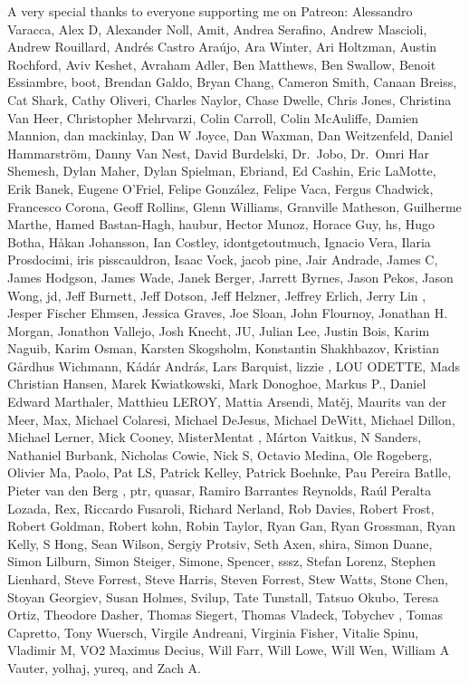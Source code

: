 \documentclass[
  letterpaper,
  DIV=11,
  numbers=noendperiod]{scrartcl}
\begin{document}
A very special thanks to everyone supporting me on Patreon: Alessandro
Varacca, Alex D, Alexander Noll, Amit, Andrea Serafino, Andrew Mascioli,
Andrew Rouillard, Andrés Castro Araújo, Ara Winter, Ari Holtzman, Austin
Rochford, Aviv Keshet, Avraham Adler, Ben Matthews, Ben Swallow, Benoit
Essiambre, boot, Brendan Galdo, Bryan Chang, Cameron Smith, Canaan
Breiss, Cat Shark, Cathy Oliveri, Charles Naylor, Chase Dwelle, Chris
Jones, Christina Van Heer, Christopher Mehrvarzi, Colin Carroll, Colin
McAuliffe, Damien Mannion, dan mackinlay, Dan W Joyce, Dan Waxman, Dan
Weitzenfeld, Daniel Hammarström, Danny Van Nest, David Burdelski,
Dr.~Jobo, Dr.~Omri Har Shemesh, Dylan Maher, Dylan Spielman, Ebriand, Ed
Cashin, Eric LaMotte, Erik Banek, Eugene O'Friel, Felipe González,
Felipe Vaca, Fergus Chadwick, Francesco Corona, Geoff Rollins, Glenn
Williams, Granville Matheson, Guilherme Marthe, Hamed Bastan-Hagh,
haubur, Hector Munoz, Horace Guy, hs, Hugo Botha, Håkan Johansson, Ian
Costley, idontgetoutmuch, Ignacio Vera, Ilaria Prosdocimi, iris
pisscauldron, Isaac Vock, jacob pine, Jair Andrade, James C, James
Hodgson, James Wade, Janek Berger, Jarrett Byrnes, Jason Pekos, Jason
Wong, jd, Jeff Burnett, Jeff Dotson, Jeff Helzner, Jeffrey Erlich, Jerry
Lin , Jesper Fischer Ehmsen, Jessica Graves, Joe Sloan, John Flournoy,
Jonathan H. Morgan, Jonathon Vallejo, Josh Knecht, JU, Julian Lee,
Justin Bois, Karim Naguib, Karim Osman, Karsten Skogsholm, Konstantin
Shakhbazov, Kristian Gårdhus Wichmann, Kádár András, Lars Barquist,
lizzie , LOU ODETTE, Mads Christian Hansen, Marek Kwiatkowski, Mark
Donoghoe, Markus P., Daniel Edward Marthaler, Matthieu LEROY, Mattia
Arsendi, Matěj, Maurits van der Meer, Max, Michael Colaresi, Michael
DeJesus, Michael DeWitt, Michael Dillon, Michael Lerner, Mick Cooney,
MisterMentat , Márton Vaitkus, N Sanders, Nathaniel Burbank, Nicholas
Cowie, Nick S, Octavio Medina, Ole Rogeberg, Olivier Ma, Paolo, Pat LS,
Patrick Kelley, Patrick Boehnke, Pau Pereira Batlle, Pieter van den Berg
, ptr, quasar, Ramiro Barrantes Reynolds, Raúl Peralta Lozada, Rex,
Riccardo Fusaroli, Richard Nerland, Rob Davies, Robert Frost, Robert
Goldman, Robert kohn, Robin Taylor, Ryan Gan, Ryan Grossman, Ryan Kelly,
S Hong, Sean Wilson, Sergiy Protsiv, Seth Axen, shira, Simon Duane,
Simon Lilburn, Simon Steiger, Simone, Spencer, sssz, Stefan Lorenz,
Stephen Lienhard, Steve Forrest, Steve Harris, Steven Forrest, Stew
Watts, Stone Chen, Stoyan Georgiev, Susan Holmes, Svilup, Tate Tunstall,
Tatsuo Okubo, Teresa Ortiz, Theodore Dasher, Thomas Siegert, Thomas
Vladeck, Tobychev , Tomas Capretto, Tony Wuersch, Virgile Andreani,
Virginia Fisher, Vitalie Spinu, Vladimir M, VO2 Maximus Decius, Will
Farr, Will Lowe, Will Wen, William A Vauter, yolhaj, yureq, and Zach A.
\end{document}
